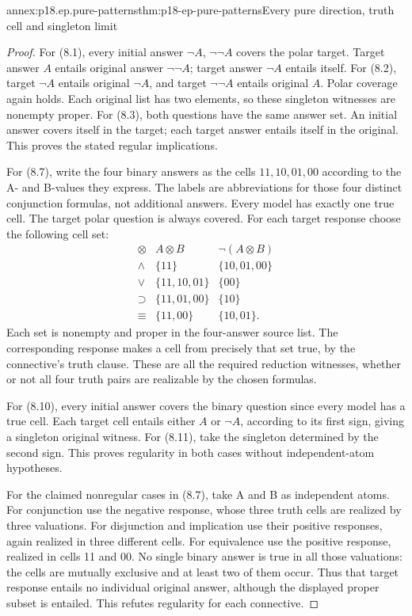 \begin{annexitem}{annex:p18.ep.pure-patterns}{thm:p18-ep-pure-patterns}{Every pure direction, truth cell and singleton limit}
\begin{proof}
For (8.1), every initial answer \(\neg A\), \(\neg\neg A\)
covers the polar target. Target answer \(A\) entails original answer
\(\neg\neg A\); target answer \(\neg A\) entails itself.
For (8.2), target \(\neg A\) entails original \(\neg A\), and
target \(\neg\neg A\) entails original \(A\). Polar coverage again
holds. Each original list has two elements, so these singleton witnesses
are nonempty proper. For (8.3), both questions have the same answer set.
An initial answer covers itself in the target; each target answer entails
itself in the original. This proves the stated regular implications.

For (8.7), write the four binary answers as the cells \(11,10,01,00\)
according to the A- and B-values they express. The labels are abbreviations
for those four distinct conjunction formulas, not additional answers.
Every model has exactly one true cell. The target polar question is always
covered. For each target response choose the following cell set:
\[
\begin{array}{c|c|c}
 \otimes& A\otimes B&\neg(A\otimes B)\\\hline
 \land&\{11\}&\{10,01,00\}\\
 \lor&\{11,10,01\}&\{00\}\\
 \supset&\{11,01,00\}&\{10\}\\
 \equiv&\{11,00\}&\{10,01\}.
\end{array}
\]
Each set is nonempty and proper in the four-answer source list. The
corresponding response makes a cell from precisely that set true, by the
connective's truth clause. These are all the required reduction witnesses,
whether or not all four truth pairs are realizable by the chosen formulas.

For (8.10), every initial answer covers the binary question since every
model has a true cell. Each target cell entails either \(A\) or
\(\neg A\), according to its first sign, giving a singleton original
witness. For (8.11), take the singleton determined by the second sign.
This proves regularity in both cases without independent-atom hypotheses.

For the claimed nonregular cases in (8.7), take A and B as independent
atoms. For conjunction use the negative response, whose three truth cells
are realized by three valuations. For disjunction and implication use
their positive responses, again realized in three different cells. For
equivalence use the positive response, realized in cells 11 and 00.
No single binary answer is true in all those valuations: the cells are
mutually exclusive and at least two of them occur. Thus that target
response entails no individual original answer, although the displayed
proper subset is entailed. This refutes regularity for each connective.
\end{proof}
\end{annexitem}

